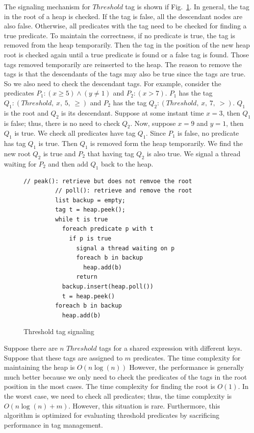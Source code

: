 \documentclass[preprint]{sigplanconf}
\begin{document}
The signaling mechanism for $Threshold$ tag is shown if Fig.~\ref{fig:th_sig}. In
general, the tag in the root of a heap is checked. If the tag is false, all the
descendant nodes are also false. Otherwise, all predicates with the tag
need to be checked for finding a true predicate. To maintain the correctness, 
if no predicate is true, the tag is removed from the heap temporarily. Then the
tag in the position of the new heap root is checked again until a true predicate is found or a
false tag is found. Those tags removed temporarily are reinserted to the heap.
The reason to remove the tags is that the descendants of the tags may also be
true since the tags are true. So we also need to check the descendant tags. For
example, consider the predicates $P_1: (x \ge 5) \wedge (y \ne 1)$ and 
$P_2: (x > 7)$. $P_1$ has the tag $Q_1: (Threshold,\ x,\ 5,\ \ge)$ and $P_2$
has the tag $Q_2: (Threshold,\ x,\ 7,\ >)$. $Q_1$ is the root and $Q_2$ is its
descendant. Suppose at some instant time $x=3$, then $Q_1$ is false; thus, there is no
need to check $Q_2$. Now, suppose $x = 9$ and $y = 1$, then $Q_1$ is true. We
check all predicates have tag $Q_1$.  Since $P_1$ is false, no predicate has
tag $Q_1$ is true. Then $Q_1$ is removed form the heap temporarily. We find the
new root $Q_2$ is true and $P_2$ that having tag $Q_2$ is also true. We signal 
a thread waiting for $P_2$ and then add $Q_1$ back to the heap. 

\begin{figure}[ht!]
    \begin{Verbatim}[fontsize=\footnotesize,gobble=8,frame=lines,
            framesep=3mm]
         // peak(): retrieve but does not remvoe the root 
         // poll(): retrieve and remove the root 
         list backup = empty;
         tag t = heap.peek();
         while t is true
           foreach predicate p with t
             if p is true
               signal a thread waiting on p
               foreach b in backup 
                 heap.add(b)
               return 
           backup.insert(heap.poll())
           t = heap.peek()
         foreach b in backup 
           heap.add(b)
    \end{Verbatim}
  \caption{Threshold tag signaling}
  \label{fig:th_sig}
\end{figure}


Suppose there are $n$ $Threshold$ tags for a shared expression with different 
keys. Suppose that these tags are assigned to $m$ predicates. The time 
complexity for maintaining the heap is $O(n \log(n))$ 
However, the performance is generally much better because we only
need to check the predicates of the tags in the root position in the most
cases. The time complexity for finding the root is $O(1)$. In the worst case, 
we need to check all predicates; thus, the time complexity is $O(n \log(n) + m)$. 
However, this situation is rare. Furthermore, this algorithm is optimized for
evaluating threshold predicates by sacrificing performance in tag management.  
\end{document}
